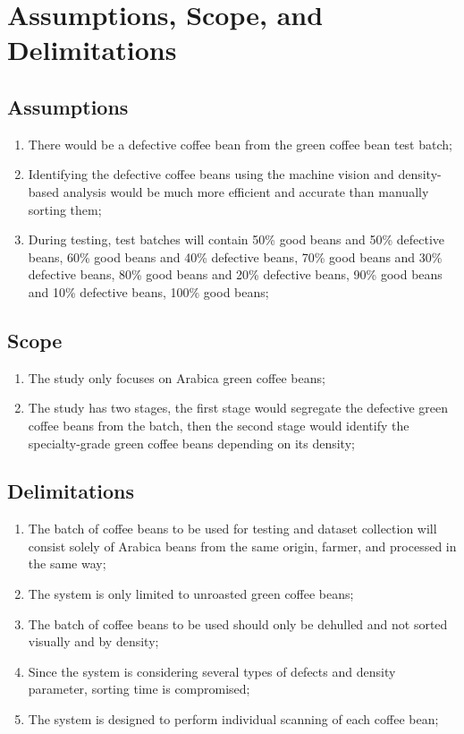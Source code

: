\section{Assumptions, Scope, and Delimitations}

\subsection{Assumptions}

\begin{enumerate}
	\item There would be a defective coffee bean from the green coffee bean test batch;
	
	\item Identifying the defective coffee beans using the machine vision and density-based analysis would be much more efficient and accurate than manually sorting them;
	
	\item During testing, test batches will contain 50\% good beans and 50\% defective beans, 60\% good beans and 40\% defective beans, 70\% good beans and 30\% defective beans, 80\% good beans and 20\% defective beans, 90\% good beans and 10\% defective beans, 100\% good beans;	
\end{enumerate}

\subsection{Scope}
\begin{enumerate}
	\item The study only focuses on Arabica green coffee beans;
	
	\item The study has two stages, the first stage would segregate the defective green coffee beans from the batch, then the second stage would identify the specialty-grade green coffee beans depending on its density;
\end{enumerate}

\subsection{Delimitations}
\begin{enumerate}
	\item The batch of coffee beans to be used for testing and dataset collection will consist solely of Arabica beans from the same origin, farmer, and processed in the same way;
	
	\item The system is only limited to unroasted green coffee beans;
	
	\item The batch of coffee beans to be used should only be dehulled and not sorted visually and by density;

	\item Since the system is considering several types of defects and density parameter, sorting time is compromised;

	\item The system is designed to perform individual scanning of each coffee bean;
\end{enumerate}
